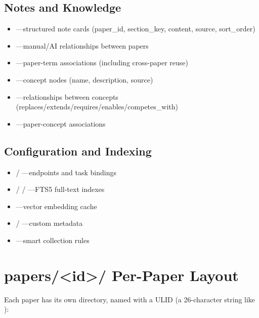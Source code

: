 \subsection{Notes and Knowledge}

\begin{itemize}
  \item {}---structured note cards (paper\_id, section\_key,
    content, source, sort\_order)
  \item {}---manual/AI relationships between papers
  \item {}---paper-term associations (including cross-paper reuse)
  \item {}---concept nodes (name, description, source)
  \item {}---relationships between concepts
    (replaces/extends/requires/enables/competes\_with)
  \item {}---paper-concept associations
\end{itemize}

\subsection{Configuration and Indexing}

\begin{itemize}
  \item {} / ---endpoints and task bindings
  \item {} /  / ---FTS5 full-text indexes
  \item {}---vector embedding cache
  \item {} / ---custom metadata
  \item {}---smart collection rules
\end{itemize}

\section{papers/<id>/ Per-Paper Layout}

Each paper has its own directory, named with a ULID (a 26-character string like
):

